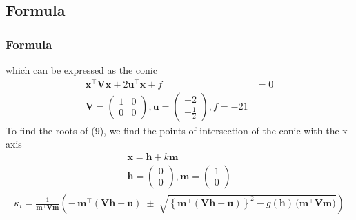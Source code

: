 \documentclass{beamer}
\providecommand{\brak}[1]{\ensuremath{\left(#1\right)}}
\providecommand{\cbrak}[1]{\ensuremath{\left\{#1\right\}}}
\theoremstyle{remark}
\newcommand{\myvec}[1]{\ensuremath{\begin{pmatrix}#1\end{pmatrix}}}
\let\vec\mathbf
\numberwithin{equation}{section}
\begin{document}
\subsection{Formula}
\begin{frame}
\frametitle{Formula}
 which can be expressed as the conic
  \begin{align}
       \vec{x}^\top\vec{V}\vec{x} + 2\vec{u}^\top\vec{x} + f &= 0 \\
       \vec{V}=\myvec{1 & 0 \\ 0&0},\vec{u}=\myvec{-2\\-\frac{1}{2}},f=-21
  \end{align}
   To find the roots of (9), we find the points of intersection of the conic with
the x-axis
\begin{align}
\vec{x}=\vec{h}+k\vec{m}\\
\vec{h}=\myvec{0\\0},\vec{m}=\myvec{1\\0}
\end{align}
\begin{align}
\kappa_i= \frac{1}{\vec{m}^\top \vec{V}\vec{m}}\brak{
       -\,\vec{m}^\top\brak{\vec{V}\vec{h}+\vec{u}}
       \;\pm\;
       \sqrt{ \cbrak{\vec{m}^\top(\vec{V}\vec{h}+\vec{u})}^2
       - g(\vec{h})\,\big(\vec{m}^\top \vec{V}\vec{m}\big)}
     }
\end{align}
 \end{frame}
\end{document}
